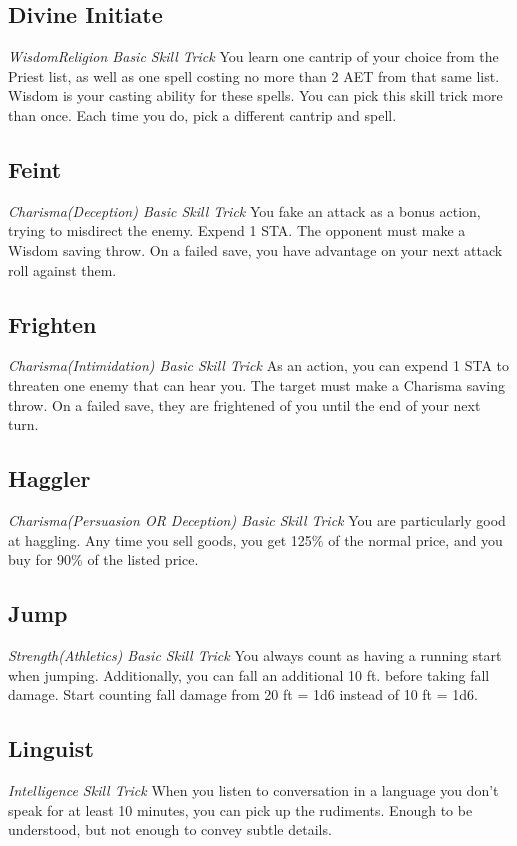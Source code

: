 \subsection{Divine Initiate}
\textit{Wisdom{Religion} Basic Skill Trick}
You learn one cantrip of your choice from the Priest list, as well as one spell costing no more than 2 AET from that same list. Wisdom is your casting ability for these spells. You can pick this skill trick more than once. Each time you do, pick a different cantrip and spell.

\subsection{Feint}\label{st:feint}
\textit{Charisma(Deception) Basic Skill Trick}
You fake an attack as a bonus action, trying to misdirect the enemy. Expend 1 STA. The opponent must make a Wisdom saving throw. On a failed save, you have advantage on your next attack roll against them.

\subsection{Frighten} \label{st:frighten}
\textit{Charisma(Intimidation) Basic Skill Trick}
As an action, you can expend 1 STA to threaten one enemy that can hear you. The target must make a Charisma saving throw. On a failed save, they are frightened of you until the end of your next turn.

\subsection{Haggler}\label{st:haggler}
\textit{Charisma(Persuasion OR Deception) Basic Skill Trick}
You are particularly good at haggling. Any time you sell goods, you get 125\% of the normal price, and you buy for 90\% of the listed price.

\subsection{Jump}
\textit{Strength(Athletics) Basic Skill Trick}
You always count as having a running start when jumping. Additionally, you can fall an additional 10 ft. before taking fall damage. Start counting fall damage from 20 ft = 1d6 instead of 10 ft = 1d6.

\subsection{Linguist}\label{st:linguist}
\textit{Intelligence Skill Trick}
When you listen to conversation in a language you don't speak for at least 10 minutes, you can pick up the rudiments. Enough to be understood, but not enough to convey subtle details.

